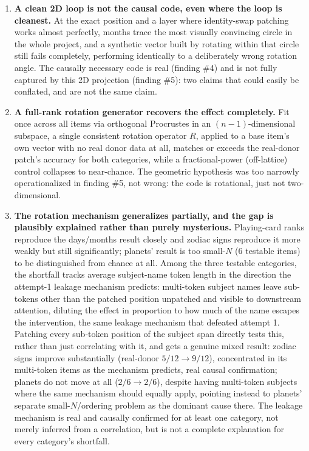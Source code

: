 \documentclass[11pt]{article}
\begin{document}
\begin{enumerate}
        succeeds. The effect has a sharp, well-defined depth cutoff rather
        than fading gradually, suggesting a genuine localization of where
        this identity is read out.
  \item \textbf{A clean 2D loop is not the causal code, even where the loop
        is cleanest.} At the exact position and a layer where identity-swap
        patching works almost perfectly, months trace the most visually
        convincing circle in the whole project, and a synthetic vector built
        by rotating within that circle still fails completely, performing
        identically to a deliberately wrong rotation angle. The causally
        necessary code is real (finding \#4) and is not fully captured by
        this 2D projection (finding \#5): two claims that could easily be
        conflated, and are not the same claim.
  \item \textbf{A full-rank rotation generator recovers the effect
        completely.} Fit once across all items via orthogonal Procrustes in
        an $(n{-}1)$-dimensional subspace, a single consistent rotation
        operator $R$, applied to a base item's own vector with no real donor
        data at all, matches or exceeds the real-donor patch's accuracy for
        both categories, while a fractional-power (off-lattice) control
        collapses to near-chance. The geometric hypothesis was too narrowly
        operationalized in finding \#5, not wrong: the code is rotational,
        just not two-dimensional.
  \item \textbf{The rotation mechanism generalizes partially, and the gap is
        plausibly explained rather than purely mysterious.} Playing-card
        ranks reproduce the days/months result closely and zodiac signs
        reproduce it more weakly but still significantly; planets' result
        is too small-$N$ (6 testable items) to be distinguished from
        chance at all. Among the three testable categories, the shortfall
        tracks average subject-name token length in the direction the
        attempt-1 leakage mechanism predicts: multi-token subject names
        leave sub-tokens other than the patched position unpatched and
        visible to downstream attention, diluting the effect in proportion
        to how much of the name escapes the intervention, the same leakage
        mechanism that defeated attempt 1. Patching every sub-token position
        of the subject span directly tests this, rather than just
        correlating with it, and gets a genuine mixed result: zodiac signs
        improve substantially (real-donor $5/12\to9/12$), concentrated in
        its multi-token items as the mechanism predicts, real causal
        confirmation; planets do not move at all ($2/6\to2/6$), despite
        having multi-token subjects where the same mechanism should equally
        apply, pointing instead to planets' separate small-$N$/ordering
        problem as the dominant cause there. The leakage mechanism is real
        and causally confirmed for at least one category, not merely
        inferred from a correlation, but is not a complete explanation for
        every category's shortfall.
\end{enumerate}
\end{document}

